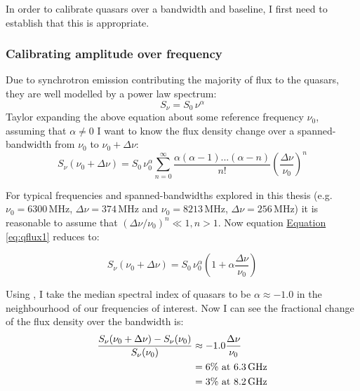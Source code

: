 		In order to calibrate quasars over a bandwidth and baseline, I first need to establish that this is appropriate.
		\subsubsection{Calibrating amplitude over frequency}
			Due to synchrotron emission contributing the majority of flux to the quasars, they are well modelled by a power law spectrum:
			\begin{equation}
				S_\nu=S_0\,\nu^{\alpha}
			\end{equation}
			Taylor expanding the above equation about some reference frequency $\nu_0$, assuming that $\alpha\not=0$ %
		    I want to know the flux density change over a spanned-bandwidth from $\nu_0$ to $\nu_0+\Delta\nu$:
			\begin{equation}
			S_\nu(\nu_0+\Delta\nu) =S_0\,\nu_0^{\alpha}\sum_{n=0}^{\infty}\frac{\alpha(\alpha-1)...(\alpha-n)}{n!}\left(\frac{\Delta\nu}{\nu_0}\right)^n
			\label{eq:qflux1}
			\end{equation}

			For typical frequencies and spanned-bandwidths explored in this thesis (e.g. $\nu_0=6300$\,MHz, $\Delta\nu=374$\,MHz and $\nu_0=8213$\,MHz, $\Delta\nu=256$\,MHz) it is reasonable to assume that $\left(\Delta\nu/\nu_0\right)^n \ll 1, n>1$. Now equation \hyperref[eq:qflux1]{Equation \ref*{eq:qflux1}} reduces to:

			\begin{equation}
			S_\nu(\nu_0+\Delta\nu) =S_0\,\nu_0^{\alpha}\left(1+\alpha\frac{\Delta\nu}{\nu_0}\right)
			\end{equation}

			Using \citet{Kellermann1969}, I take the median spectral index of quasars to be $\alpha\approx-1.0$ in the neighbourhood of our frequencies of interest. Now I can see the fractional change of the flux density over the bandwidth is:
			\begin{align*}
			\frac{S_\nu(\nu_0+\Delta\nu)-S_\nu(\nu_0)}{S_\nu(\nu_0)} &\approx -1.0\frac{\Delta\nu}{\nu_0} \\
			 &= 6\% \text{   at 6.3\,GHz} \\
			 &= 3\% \text{   at 8.2\,GHz}
			\end{align*}

